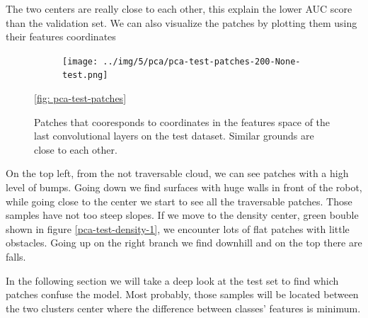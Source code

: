 \documentclass[../document.tex]{subfiles}
\begin{document}
The two centers are really close to each other, this explain the lower AUC score than the validation set. We can also visualize the patches by plotting them using their features coordinates
\begin{figure}[H]
    \centering
    \begin{subfigure}[b]{1\textwidth}
        \texttt{[image: ../img/5/pca/pca-test-patches-200-None-test.png]}
    \end{subfigure}
\caption{Patches that cooresponds to coordinates in the features space of the last convolutional layers on the test dataset. Similar grounds are close to each other.}
\ref{fig: pca-test-patches}
\end{figure}
On the top left, from the not traversable cloud, we can see patches with a high level of bumps. Going down we find surfaces with huge walls in front of the robot, while going close to the center we start to see all the traversable patches. Those samples have not too steep slopes. If we move to the density center, green bouble shown in figure \ref{pca-test-density-1}, we encounter lots of flat patches with little obstacles. Going up on the right branch we find downhill and on the top there are falls. 

In the following section we will take a deep look at the test set to find which patches confuse the model. Most probably, those samples will be located between the two clusters center where the difference between classes' features is minimum.
\end{document}
